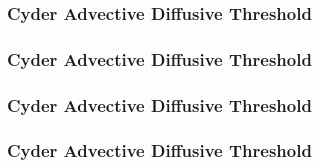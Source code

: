 
\begin{frame}[ctb!]
\frametitle{Cyder Advective Diffusive Threshold}

\end{frame}

\begin{frame}[ctb!]
\frametitle{Cyder Advective Diffusive Threshold}

\end{frame}

\begin{frame}[ctb!]
\frametitle{Cyder Advective Diffusive Threshold}

%
\end{frame}

\begin{frame}[ctb!]
\frametitle{Cyder Advective Diffusive Threshold}

\end{frame}
